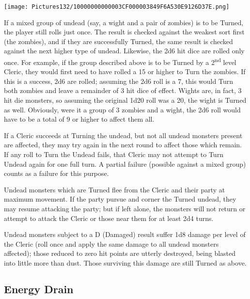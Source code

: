 \documentclass[a4paper,twoside,openany,10pt]{book}
\begin{document}
\begin{multicols}{2}
	

\begin{flushleft}
	\texttt{[image: Pictures132/10000000000003CF000003849F6A530E9126D37E.png]}
\end{flushleft}

If a mixed group of undead (say, a wight and a pair of zombies) is to be Turned, the player still rolls just once. The result is checked against the weakest sort first (the zombies), and if they are successfully Turned, the same result is checked against the next higher type of undead. Likewise, the 2d6 hit dice are rolled only once. For example, if the group described above is to be Turned by a 2\textsuperscript{nd} level Cleric, they would first need to have rolled a 15 or higher to Turn the zombies. If this is a success, 2d6 are rolled; assuming the 2d6 roll is a 7, this would Turn both zombies and leave a remainder of 3 hit dice of effect. Wights are, in fact, 3 hit die monsters, so assuming the original 1d20 roll was a 20, the wight is Turned as well. Obviously, were it a group of 3 zombies and a wight, the 2d6 roll would have to be a total of 9 or higher to affect them all.

If a Cleric succeeds at Turning the undead, but not all undead monsters present are affected, they may try again in the next round to affect those which remain. If any roll to Turn the Undead fails, that Cleric may not attempt to Turn Undead again for one full turn. A partial failure (possible against a mixed group) counts as a failure for this purpose.

Undead monsters which are Turned flee from the Cleric and their party at maximum movement. If the party pursue and corner the Turned undead, they may resume attacking the party; but if left alone, the monsters will not return or attempt to attack the Cleric or those near them for at least 2d4 turns.

Undead monsters subject to a D (Damaged) result suffer 1d8 damage per level of the Cleric (roll once and apply the same damage to all undead monsters affected); those reduced to zero hit points are utterly destroyed, being blasted into little more than dust. Those surviving this damage are still Turned as above.

\subsection{Energy Drain}\label{energy-drain}


\end{multicols}
\end{document}
